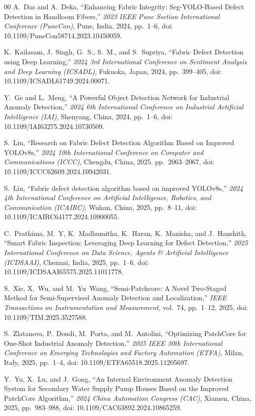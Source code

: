 \documentclass{ieeeaccess}
\begin{document}
\begin{thebibliography}{00}
 A.~Das and A.~Deka, ``Enhancing Fabric Integrity: Seg-YOLO-Based Defect Detection in Handloom Fibers,'' \textit{2023 IEEE Pune Section International Conference (PuneCon)}, Pune, India, 2024, pp.~1--6, doi: 10.1109/PuneCon58714.2023.10450059.

 K.~Kailasam, J.~Singh, G.~S., S.~M., and S.~Supriya, ``Fabric Defect Detection using Deep Learning,'' \textit{2024 3rd International Conference on Sentiment Analysis and Deep Learning (ICSADL)}, Fukuoka, Japan, 2024, pp.~399--405, doi: 10.1109/ICSADL61749.2024.00071.

 Y.~Ge and L.~Meng, ``A Powerful Object Detection Network for Industrial Anomaly Detection,'' \textit{2024 6th International Conference on Industrial Artificial Intelligence (IAI)}, Shenyang, China, 2024, pp.~1--6, doi: 10.1109/IAI63275.2024.10730509.

 S.~Liu, ``Research on Fabric Defect Detection Algorithm Based on Improved YOLOv8s,'' \textit{2024 10th International Conference on Computer and Communications (ICCC)}, Chengdu, China, 2025, pp.~2063--2067, doi: 10.1109/ICCC62609.2024.10942031.

 S.~Liu, ``Fabric defect detection algorithm based on improved YOLOv8s,'' \textit{2024 4th International Conference on Artificial Intelligence, Robotics, and Communication (ICAIRC)}, Wuhan, China, 2025, pp.~8--11, doi: 10.1109/ICAIRC64177.2024.10900055.

 C.~Prathima, M.~Y, K.~Madhumitha, K.~Haran, K.~Manisha, and J.~Hanshith, ``Smart Fabric Inspection: Leveraging Deep Learning for Defect Detection,'' \textit{2025 International Conference on Data Science, Agents \& Artificial Intelligence (ICDSAAI)}, Chennai, India, 2025, pp.~1--6, doi: 10.1109/ICDSAAI65575.2025.11011778.

 S.~Xie, X.~Wu, and M.~Yu~Wang, ``Semi-Patchcore: A Novel Two-Staged Method for Semi-Supervised Anomaly Detection and Localization,'' \textit{IEEE Transactions on Instrumentation and Measurement}, vol.~74, pp.~1--12, 2025, doi: 10.1109/TIM.2025.3527588.

 S.~Zlatanova, P.~Dondi, M.~Porta, and M.~Antolini, ``Optimizing PatchCore for One-Shot Industrial Anomaly Detection,'' \textit{2025 IEEE 30th International Conference on Emerging Technologies and Factory Automation (ETFA)}, Milan, Italy, 2025, pp.~1--4, doi: 10.1109/ETFA65518.2025.11205697.

 Y.~Yu, X.~Lu, and J.~Gong, ``An Internal Environment Anomaly Detection System for Secondary Water Supply Pump Houses Based on the Improved PatchCore Algorithm,'' \textit{2024 China Automation Congress (CAC)}, Xiamen, China, 2025, pp.~983--988, doi: 10.1109/CAC63892.2024.10865259.


\end{thebibliography}
\end{document}
